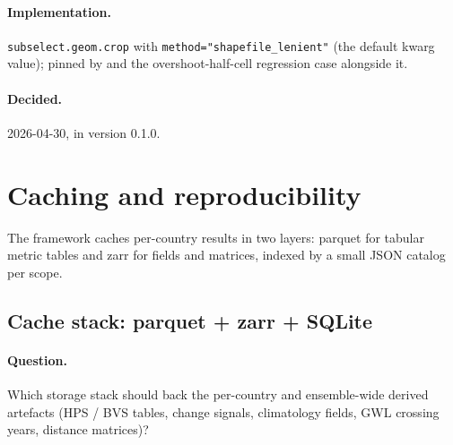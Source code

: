 \documentclass[11pt,a4paper]{article}
\begin{document}
\paragraph{Implementation.} \texttt{subselect.geom.crop} with
\texttt{method="shapefile\_lenient"} (the default kwarg value); pinned by
and the overshoot-half-cell regression case alongside it.

\paragraph{Decided.} 2026-04-30, in version 0.1.0.

\section{Caching and reproducibility}\label{sec:caching}

The framework caches per-country results in two layers: parquet for tabular
metric tables and zarr for fields and matrices, indexed by a small JSON
catalog per scope.


\subsection{Cache stack: parquet + zarr + SQLite}\label{sec:caching-stack}

\paragraph{Question.} Which storage stack should back the per-country and
ensemble-wide derived artefacts (HPS / BVS tables, change signals, climatology
fields, GWL crossing years, distance matrices)?
\end{document}
